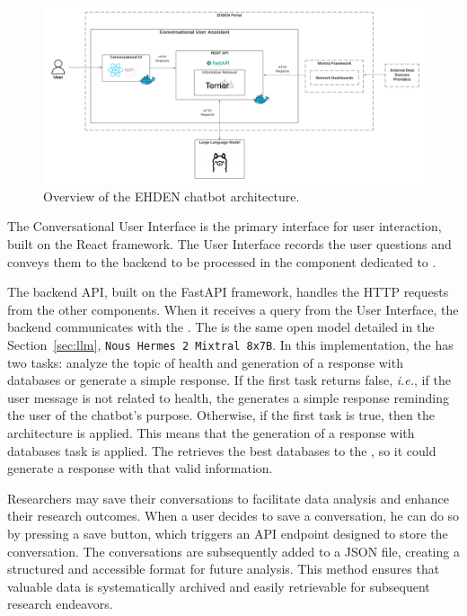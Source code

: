 \begin{figure}[H]
    \includegraphics[width=1\textwidth]{figs/chapter3/architecture.png}
    \centering
    \caption[Overview of the chatbot architecture]{Overview of the EHDEN chatbot architecture.}
    \label{fig_arch}
\end{figure}

The Conversational User Interface is the primary interface for user interaction, built on the React framework. The User Interface records the user questions and conveys them to the backend to be processed in the component dedicated to {\ir}. 

The backend API, built on the FastAPI framework, handles the HTTP requests from the other components. When it receives a query from the User Interface, the backend communicates with the {\llm}. The {\llm} is the same open model detailed in the Section~\ref{sec:llm}, \texttt{Nous Hermes 2 Mixtral 8x7B}. In this implementation, the {\llm} has two tasks: analyze the topic of health and generation of a response with databases or generate a simple response. If the first task returns false, \textit{i.e.}, if the user message is not related to health, the {\llm} generates a simple response reminding the user of the chatbot's purpose. Otherwise, if the first task is true, then the {\rag} architecture is applied. This means that the generation of a response with databases task is applied. The {\bm} retrieves the best databases to the {\llm}, so it could generate a response with that valid information.

Researchers may save their conversations to facilitate data analysis and enhance their research outcomes. When a user decides to save a conversation, he can do so by pressing a save button, which triggers an API endpoint designed to store the conversation. The conversations are subsequently added to a JSON file, creating a structured and accessible format for future analysis. This method ensures that valuable data is systematically archived and easily retrievable for subsequent research endeavors.

